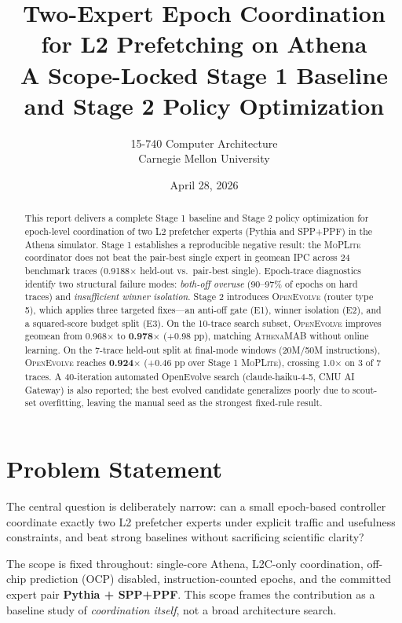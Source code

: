 \documentclass[10pt,twocolumn]{article}
\title{\textbf{Two-Expert Epoch Coordination for L2 Prefetching on Athena}\\
\large A Scope-Locked Stage 1 Baseline and Stage 2 Policy Optimization}
\author{15-740 Computer Architecture\\
Carnegie Mellon University}
\date{April 28, 2026}
\begin{document}
\maketitle

\begin{abstract}
This report delivers a complete Stage 1 baseline and Stage 2 policy optimization
for epoch-level coordination of two L2 prefetcher experts (Pythia and SPP+PPF) in
the Athena simulator. Stage 1 establishes a reproducible negative result: the
\textsc{MoPLite} coordinator does not beat the pair-best single expert in geomean IPC
across 24 benchmark traces (0.9188$\times$ held-out vs.\ pair-best single).
Epoch-trace diagnostics identify two structural failure modes: \textit{both-off overuse}
(90--97\% of epochs on hard traces) and \textit{insufficient winner isolation}.
Stage 2 introduces \textsc{OpenEvolve} (router type 5), which applies three targeted
fixes—an anti-off gate (E1), winner isolation (E2), and a squared-score budget split
(E3). On the 10-trace search subset, \textsc{OpenEvolve} improves geomean from 0.968$\times$
to \textbf{0.978$\times$} (+0.98 pp), matching \textsc{AthenaMAB} without online learning.
On the 7-trace held-out split at final-mode windows (20M/50M instructions),
\textsc{OpenEvolve} reaches \textbf{0.924$\times$} (+0.46 pp over Stage 1 \textsc{MoPLite}),
crossing 1.0$\times$ on 3 of 7 traces. A 40-iteration automated OpenEvolve search
(claude-haiku-4-5, CMU AI Gateway) is also reported; the best evolved candidate
generalizes poorly due to scout-set overfitting, leaving the manual seed as the
strongest fixed-rule result.
\end{abstract}

\section{Problem Statement}
\label{sec:problem}

The central question is deliberately narrow: can a small epoch-based controller
coordinate exactly two L2 prefetcher experts under explicit traffic and usefulness
constraints, and beat strong baselines without sacrificing scientific clarity?

The scope is fixed throughout: single-core Athena, L2C-only coordination,
off-chip prediction (OCP) disabled, instruction-counted epochs, and the committed
expert pair \textbf{Pythia + SPP+PPF}. This scope frames the contribution as a
baseline study of \emph{coordination itself}, not a broad architecture search.
\end{document}
